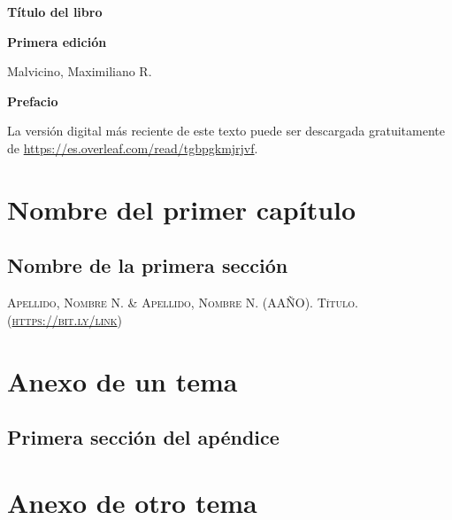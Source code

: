 \documentclass[a5paper,12pt,twoside]{book}
\begin{document}
\pagestyle{fancy}
\fancyhf{}
\chead{\scriptsize \nouppercase\rightmark}
\cfoot{\scriptsize \thepage}
\renewcommand{\headrulewidth}{0pt}

\frontmatter
% 

\begin{center}
    \begin{Huge}
        \textbf{Título del libro}
    \end{Huge}

    \vspace{1cm}
    \textbf{Primera edición}
    \vspace{2cm}

    \begin{Large}
        Malvicino, Maximiliano R.
    \end{Large}
\end{center}

\clearpage
\noindent
\textbf{Prefacio}

La versión digital más reciente de este texto puede ser descargada gratuitamente de \url{https://es.overleaf.com/read/tgbpgkmjrjvf}.

\renewcommand{\spanishappendixname}{Anexo}
\tableofcontents

\mainmatter
{}


\chapter{Nombre del primer capítulo}


\section{Nombre de la primera sección}


\begin{thebibliography}{1}
     \textsc{Apellido, Nombre N. \& Apellido, Nombre N. (AAÑO). Título. \\ (\url{https://bit.ly/link}})
\end{thebibliography}


\appendix


\chapter{Anexo de un tema}


\section{Primera sección del apéndice}


\chapter{Anexo de otro tema}
\end{document}
